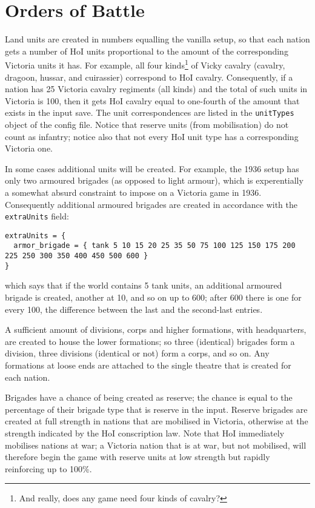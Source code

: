 \documentclass[12pt,ebook,oneside]{book}
\begin{document}
\section{Orders of Battle}

Land units are created in numbers equalling the vanilla setup, so that
each nation gets a number of HoI units proportional to the amount of the
corresponding Victoria units it has. For example, all four
kinds\footnote{And really, does any game need four kinds of cavalry?}
of Vicky cavalry (cavalry, dragoon, hussar, and cuirassier) correspond
to HoI cavalry. Consequently, if a nation has 25 Victoria cavalry
regiments (all kinds) and the total of such units in Victoria is 100,
then it gets HoI cavalry equal to one-fourth of the amount that exists
in the input save. The unit correspondences are listed in the
\texttt{unitTypes} object of the config file. Notice that reserve
units (from mobilisation) do not count as infantry; notice also that
not every HoI unit type has a corresponding Victoria one. 

In some cases additional units will be created. For example, the 1936
setup has only two armoured brigades (as opposed to light armour),
which is experentially a somewhat absurd constraint to impose on a
Victoria game in 1936. Consequently additional armoured brigades are
created in accordance with the \texttt{extraUnits} field:
\begin{verbatim}
extraUnits = {
  armor_brigade = { tank 5 10 15 20 25 35 50 75 100 125 150 175 200 225 250 300 350 400 450 500 600 }
}
\end{verbatim}
which says that if the world contains 5 tank units, an additional
armoured brigade is created, another at 10, and so on up to 600; after
600 there is one for every 100, the difference between the last and
the second-last entries. 

A sufficient amount of divisions, corps and higher formations, with headquarters, are created to
house the lower formations; so three (identical) brigades form a
division, three divisions (identical or not) form a corps, and so
on. Any formations at loose ends are attached to the single theatre
that is created for each nation. 

Brigades have a chance of being created as reserve; the chance is
equal to the percentage of their brigade type that is reserve in the
input. Reserve brigades are created at full strength in nations that
are mobilised in Victoria, otherwise at the strength indicated by
the HoI conscription law. Note that HoI immediately mobilises nations
at war; a Victoria nation that is at war, but not mobilised, will
therefore begin the game with reserve units at low strength but
rapidly reinforcing up to 100\%. 
\end{document}
